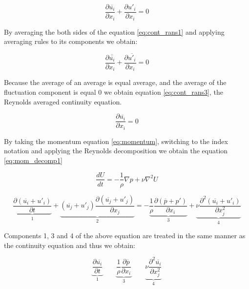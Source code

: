 \begin{equation} \label{eq:cont_rans1}
\frac{\partial \overline{u_i}}{\partial x_i} + \frac{\partial u'_i}{\partial x_i} = 0
\end{equation}

By averaging the both sides of the equation  \ref{eq:cont_rans1} and applying averaging rules to its components we obtain:

\begin{equation} \label{eq:cont_rans2}
\frac{\partial \overline{\overline{u_i}}}{\partial x_i} + \frac{\partial \overline{u'_i}}{\partial x_i} = 0
\end{equation}

Because the average of an average is equal average, and  the average of the fluctuation component is equal 0 we obtain equation \ref{eq:cont_rans3}, the Reynolds averaged continuity equation.

\begin{equation} \label{eq:cont_rans3}
\frac{\partial \overline{u_i}}{\partial x_i} = 0
\end{equation}

By taking the momentum equation \ref{eq:momentum}, switching to the index notation and applying the Reynolds decomposition we obtain the equation \ref{eq:mom_decomp1}

\begin{equation} \label{eq:momentum}
\frac{dU}{dt} = - \frac{1}{\rho} \nabla p + \nu \nabla^{2} U
\end{equation}

\begin{equation} \label{eq:mom_decomp1}
\underbrace{\frac{\partial \left( \overline{u_i} + u'_i \right)}{\partial t}}_\text{1} 
+ \underbrace{\left( \overline{u_j} + u'_j \right) \frac{\partial \left( \overline{u_j} + u'_j \right)}{\partial x_j}}_\text{2} 
=
- \underbrace{\frac{1}{\rho} \frac{\partial \left( \overline{p} + p' \right)}{\partial x_i}}_\text{3} 
+ \underbrace{\nu \frac{\partial^2 \left( \overline{u_i} + u'_i \right)}{\partial x_j^2}}_\text{4} 
\end{equation}

Components 1, 3 and 4 of the above equation are treated in the same manner as the continuity equation and thus we obtain:

\begin{equation} \label{eq:mom_components}
\underbrace{\frac{\partial \overline{u_i}}{\partial t}}_\text{1}
\qquad
\underbrace{\frac{1}{\rho} \frac{\partial \overline{p}}{\partial x_i}}_\text{3}
\qquad
\underbrace{\nu \frac{\partial^2 \overline{u_i}}{\partial x_j^2}}_\text{4}
\end{equation}


